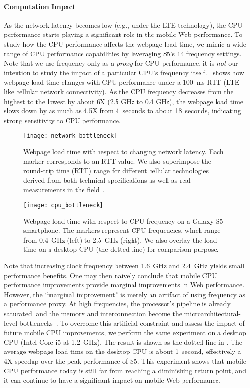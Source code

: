 \paragraph{Computation Impact} As the network latency becomes low (e.g., under the LTE technology), the CPU performance starts playing a significant role in the mobile Web performance. To study how the CPU performance affects the webpage load time, we mimic a wide range of CPU performance capabilities by leveraging S5's 14 frequency settings. Note that we use frequency only as a \textit{proxy} for CPU performance, it is \emph{not} our intention to study the impact of a particular CPU's frequency itself.~ shows how webpage load time changes with CPU performance under a 100~ms RTT (LTE-like cellular network connectivity). As the CPU frequency decreases from the highest to the lowest by about 6X (2.5 GHz to 0.4 GHz), the webpage load time slows down by as much as 4.5X from 4~seconds to about 18~seconds, indicating strong sensitivity to CPU performance.

\begin{figure}[t]
  \centering
  \texttt{[image: network\_bottleneck]}
  \caption{Webpage load time with respect to changing network latency. Each marker corresponds to an RTT value. We also superimpose the round-trip time (RTT) range for different cellular technologies derived from both technical specifications as well as real measurements in the field~\cite{HPBN, carrier_measure}.}
  \label{fig:network_bottleneck}
\end{figure}

\begin{figure}[t]
  \centering
  \texttt{[image: cpu\_bottleneck]}
  \caption{Webpage load time with respect to CPU frequency on a Galaxy S5 smartphone. The markers represent CPU frequencies, which range from 0.4~GHz (left) to 2.5~GHz (right). We also overlay the load time on a desktop CPU (the dotted line) for comparison purpose.}
  \label{fig:cpu_bottleneck}
\end{figure}

Note that increasing clock frequency between 1.6~GHz and 2.4~GHz yields small performance benefits. One may then naively conclude that mobile CPU performance improvements provide marginal improvements in Web performance. However, the ``marginal improvement'' is merely an artifact of using frequency as a performance proxy. At high frequencies, the processor's pipeline is already saturated, and the memory and interconnection become the microarchitectural-level bottlenecks~\cite{clockvsipc}. To overcome this artificial constraint and assess the impact of future mobile CPU improvements, we perform the same experiment on a desktop CPU (Intel Core i5 at 1.2~GHz). The result is shown as the dotted line in . The average webpage load time on the desktop CPU is about 1~second, effectively a 4X speedup over the peak performance of S5. This experiment shows that mobile CPU performance today is still far from reaching a diminishing return point, and it can continue to have a significant impact on mobile Web performance.

